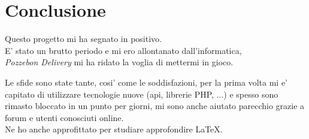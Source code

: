 \documentclass[a4paper, 12pt]{report}
\begin{document}
\section{Conclusione}
Questo progetto mi ha segnato in positivo. \\ E' stato un brutto periodo e mi ero allontanato  dall'informatica,\\ \textit{Pozzebon Delivery} mi ha ridato 
la voglia di mettermi in gioco.

Le sfide sono state tante, cosi' come le soddisfazioni, per la prima volta mi e' capitato di utilizzare tecnologie
nuove (api, librerie PHP, ...) e spesso sono rimasto bloccato in un punto per giorni, mi sono anche aiutato parecchio grazie a forum e utenti 
conosciuti online.\\
Ne ho anche approfittato per studiare approfondire \LaTeX.
\end{document}
